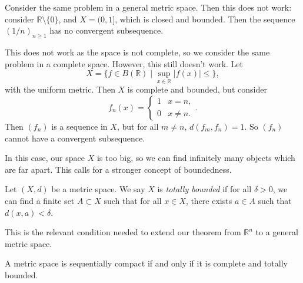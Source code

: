\documentclass[12pt]{article}
\begin{document}
Consider the same problem in a general metric space. Then this does not work: consider $\mathbb{R} \setminus \{0\}$, and $X = (0, 1]$, which is closed and bounded. Then the sequence $(1/n)_{n\geq 1}$ has no convergent subsequence.

This does not work as the space is not complete, so we consider the same problem in a complete space. However, this still doesn't work. Let
\[
	X = \{f \in B(\mathbb{R}) \mid \sup_{x \in \mathbb{R}}|f(x)| \leq \}
,\]
with the uniform metric. Then $X$ is complete and bounded, but consider
\[
	f_n(x) =
	\begin{cases}
		1 & x = n, \\
		0 & x \neq n.
	\end{cases}
.\]
Then $(f_n)$ is a sequence in $X$, but for all $m \neq n$, $d(f_m, f_n) = 1$. So $(f_n)$ cannot have a convergent subsequence.

In this case, our space $X$ is too big, so we can find infinitely many objects which are far apart. This calls for a stronger concept of boundedness.

\begin{definition}
	Let $(X, d)$ be a metric space. We say $X$ is \textit{totally bounded} if for all $\delta > 0$, we can find a finite set $A \subset X$ such that for all $x \in X$, there exists $a \in A$ such that $d(x, a) < \delta$.
\end{definition}

This is the relevant condition needed to extend our theorem from $\mathbb{R}^{n}$ to a general metric space.

\begin{theorem}
	A metric space is sequentially compact if and only if it is complete and totally bounded.
\end{theorem}
\end{document}
